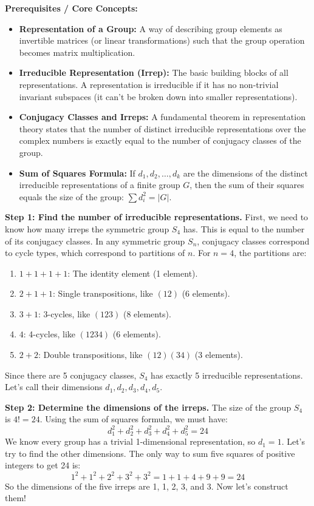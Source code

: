 \begin{solution}
\textbf{Prerequisites / Core Concepts:}
\begin{itemize}
    \item \textbf{Representation of a Group:} A way of describing group elements as invertible matrices (or linear transformations) such that the group operation becomes matrix multiplication.
    \item \textbf{Irreducible Representation (Irrep):} The basic building blocks of all representations. A representation is irreducible if it has no non-trivial invariant subspaces (it can't be broken down into smaller representations).
    \item \textbf{Conjugacy Classes and Irreps:} A fundamental theorem in representation theory states that the number of distinct irreducible representations over the complex numbers is exactly equal to the number of conjugacy classes of the group.
    \item \textbf{Sum of Squares Formula:} If $d_1, d_2, \dots, d_k$ are the dimensions of the distinct irreducible representations of a finite group $G$, then the sum of their squares equals the size of the group: $\sum d_i^2 = |G|$.
\end{itemize}

\textbf{Step 1: Find the number of irreducible representations.}
First, we need to know how many irreps the symmetric group $S_4$ has. This is equal to the number of its conjugacy classes.
In any symmetric group $S_n$, conjugacy classes correspond to cycle types, which correspond to partitions of $n$. For $n=4$, the partitions are:
\begin{enumerate}
    \item $1+1+1+1$: The identity element (1 element).
    \item $2+1+1$: Single transpositions, like $(12)$ (6 elements).
    \item $3+1$: 3-cycles, like $(123)$ (8 elements).
    \item $4$: 4-cycles, like $(1234)$ (6 elements).
    \item $2+2$: Double transpositions, like $(12)(34)$ (3 elements).
\end{enumerate}
Since there are 5 conjugacy classes, $S_4$ has exactly 5 irreducible representations. Let's call their dimensions $d_1, d_2, d_3, d_4, d_5$.

\textbf{Step 2: Determine the dimensions of the irreps.}
The size of the group $S_4$ is $4! = 24$. Using the sum of squares formula, we must have:
\[ d_1^2 + d_2^2 + d_3^2 + d_4^2 + d_5^2 = 24 \]
We know every group has a trivial 1-dimensional representation, so $d_1 = 1$. Let's try to find the other dimensions. The only way to sum five squares of positive integers to get 24 is:
\[ 1^2 + 1^2 + 2^2 + 3^2 + 3^2 = 1 + 1 + 4 + 9 + 9 = 24 \]
So the dimensions of the five irreps are 1, 1, 2, 3, and 3. Now let's construct them!


\end{solution}
